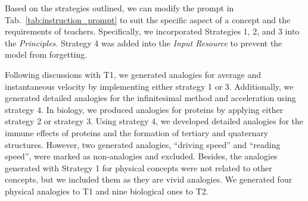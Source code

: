 





Based on the strategies outlined, we can modify the prompt in Tab.~\ref{tab:instruction_prompt} to suit the specific aspect of a concept and the requirements of teachers.
Specifically, we incorporated Strategies 1, 2, and 3 into the \textit{Principles}.
Strategy 4 was added into the \textit{Input Resource} to prevent the model from forgetting.

Following discussions with T1, we generated analogies for average and instantaneous velocity by implementing either strategy 1 or 3. 
Additionally, we generated detailed analogies for the infinitesimal method and acceleration using strategy 4. 
In biology, we produced analogies for proteins by applying either strategy 2 or strategy 3. 
Using strategy 4, we developed detailed analogies for the immune effects of proteins and the formation of tertiary and quaternary structures. 
However, two generated analogies, ``driving speed'' and ``reading speed'', were marked as non-analogies and excluded. 
Besides, the analogies generated with Strategy 1 for physical concepts were not related to other concepts, but we included them as they are vivid analogies.
We generated four physical analogies to T1 and nine biological ones to T2.



